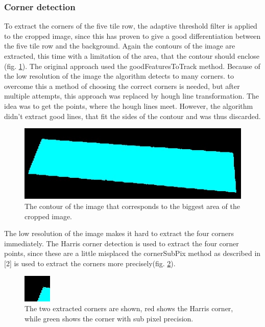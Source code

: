 \documentclass{article}
\begin{document}
\subsubsection*{Corner detection}
To extract the corners of the five tile row, the adaptive threshold filter is applied to the cropped image, since this has proven to give a good differentiation between the five tile row and the background. Again the contours of the image are extracted, this time with a limitation of the area, that the contour should enclose (fig. \ref{fig:five}). The original approach used the goodFeaturesToTrack method. Because of the low resolution of the image the algorithm detects to many corners. to overcome this a method of choosing the correct corners is needed, but after multiple attempts, this approach was replaced by hough line transformation. The idea was to get the points, where the hough lines meet. However, the algorithm didn't extract good lines, that fit the sides of the contour and was thus discarded.\\

\begin{figure}[h!]
\centering
\includegraphics[scale=0.3]{images/5tiles.jpg}
\caption{The contour of the image that corresponds to the biggest area of the cropped image.}
\label{fig:five}
\end{figure}

The low resolution of the image makes it hard to extract the four corners immediately. The Harris corner detection is used to extract the four corner points, since these are a little misplaced the cornerSubPix method as described in [2] is used to extract the corners more precisely(fig. \ref{fig:points}).  \\

\begin{figure}[h!]
\centering
\includegraphics[scale=1]{images/Corners.jpg}
\caption{The two extracted corners are shown, red shows the Harris corner, while green shows the corner with sub pixel precision.}
\label{fig:points}
\end{figure}
\end{document}
